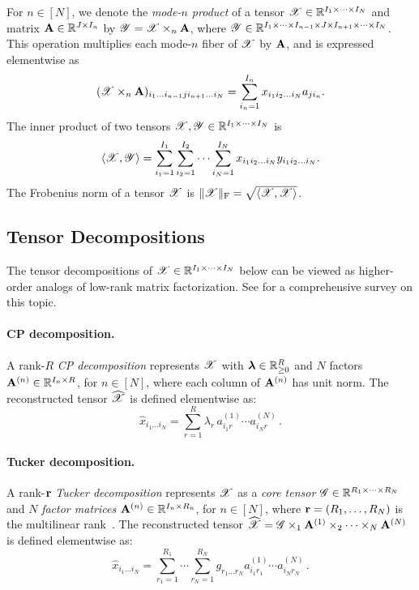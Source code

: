 For $n\in[N]$, we denote the \emph{mode-$n$ product} of a tensor
$\bm{\mathscr{X}} \in \mathbb{R}^{I_1 \times \dots \times I_N}$ and matrix
$\mathbf{A} \in \mathbb{R}^{J \times I_n}$ by
$\bm{\mathscr{Y}} = \bm{\mathscr{X}} \times_n \mathbf{A}$, where
$\bm{\mathscr{Y}} \in \mathbb{R}^{I_1 \times \dots \times I_{n-1} \times J \times I_{n+1} \times \dots \times I_{N}}$.
This operation multiplies each mode-$n$ fiber of $\bm{\mathscr{X}}$ by $\mathbf{A}$, and is expressed elementwise as
\[
    (\bm{\mathscr{X}} \times_{n} \mathbf{A})_{i_1 \dots i_{n-1} j i_{n+1} \dots i_{N}}
    =
    \sum_{i_n=1}^{I_n} x_{i_1 i_2 \dots i_N} a_{j i_n}.
\]
The inner product of two tensors $\bm{\mathscr{X}}, \bm{\mathscr{Y}} \in \mathbb{R}^{I_1 \times \dots \times I_N}$ is
\[
    \langle\bm{\mathscr{X}}, \bm{\mathscr{Y}}\rangle
    =
    \sum_{i_1=1}^{I_1}
    \sum_{i_2=1}^{I_2}
    \dots
    \sum_{i_N=1}^{I_N}
    x_{i_1 i_2 \dots i_N}
    y_{i_1 i_2 \dots i_N}.
\]
The Frobenius norm of a tensor $\bm{\mathscr{X}}$ is 
$\lVert\bm{\mathscr{X}}\rVert_{\textnormal{F}} = \sqrt{\langle\bm{\mathscr{X}}, \bm{\mathscr{X}}\rangle}$.


\subsection{Tensor Decompositions}

The tensor decompositions of $\bm{\mathscr{X}} \in \mathbb{R}^{I_1 \times \dots \times I_N}$ below can be viewed as higher-order analogs of low-rank matrix factorization.
See \citet{kolda2009tensor} for a comprehensive survey on this topic.

\paragraph{CP decomposition.}
A rank-$R$ \emph{CP decomposition} represents $\bm{\mathscr{X}}$
with $\boldsymbol{\lambda} \in \mathbb{R}_{\geq 0}^R$ and $N$ factors $\mathbf{A}^{(n)} \in \mathbb{R}^{I_n \times R}$, for $n\in [N]$,
where each column of $\mathbf{A}^{(n)}$ has unit norm.
The reconstructed tensor $\widehat{\bm{\mathscr{X}}}$ is defined elementwise as:
\[
    \widehat{x}_{i_1 \ldots i_N} = \sum_{r=1}^R \lambda_r \, a^{(1)}_{i_1 r} \cdots a^{(N)}_{i_N r}\,.
\]

\paragraph{Tucker decomposition.}
A rank-$\mathbf{r}$ \emph{Tucker decomposition} represents $\bm{\mathscr{X}}$ as a \emph{core tensor} $\bm{\mathscr{G}} \in \mathbb{R}^{R_1 \times \dots \times R_N}$ and $N$ \emph{factor matrices} $\mathbf{A}^{(n)} \in \mathbb{R}^{I_n \times R_n}$, for $n\in [N]$,
where $\mathbf{r} = (R_1,\dots,R_N)$ is the multilinear rank~\citep{ghadiri2023approximately}.
The reconstructed tensor
$\widehat{\bm{\mathscr{X}}}=\bm{\mathscr{G}} \times_{1} \mathbf{A}^{(1)} \times_{2} \dots \times_{N} \mathbf{A}^{(N)}$
is defined elementwise as:
\[
    \widehat{x}_{i_1 \ldots i_N}
    =
    \sum_{r_1=1}^{R_1} \cdots \sum_{r_N=1}^{R_N}
    g_{r_1 \ldots r_N} a_{i_1 r_1}^{(1)} \cdots a_{i_N r_N}^{(N)}\,.
\]

